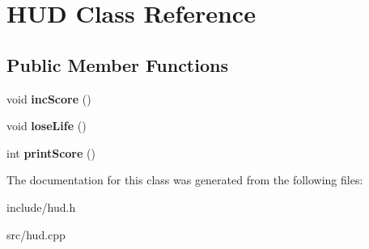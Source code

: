 \hypertarget{classHUD}{
\section{HUD Class Reference}
\label{classHUD}
}
\subsection*{Public Member Functions}
\begin{DoxyCompactItemize}
\item 
\hypertarget{classHUD_a91109f96030e0e399076f91b3114329f}{
void {\bfseries incScore} ()}
\label{classHUD_a91109f96030e0e399076f91b3114329f}

\item 
\hypertarget{classHUD_a7e8c753d8f1508dd3372ca0c328d3f84}{
void {\bfseries loseLife} ()}
\label{classHUD_a7e8c753d8f1508dd3372ca0c328d3f84}

\item 
\hypertarget{classHUD_a3d139d94e457a5b363106236af7dd620}{
int {\bfseries printScore} ()}
\label{classHUD_a3d139d94e457a5b363106236af7dd620}

\end{DoxyCompactItemize}


The documentation for this class was generated from the following files:\begin{DoxyCompactItemize}
\item 
include/hud.h\item 
src/hud.cpp\end{DoxyCompactItemize}
